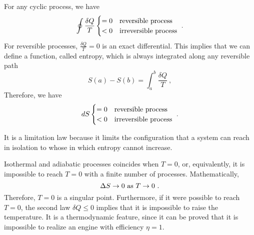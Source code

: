     \begin{law}[2nd]
        For any cyclic process, we have
        \begin{equation*}
            \oint \frac{\delta Q}{T} \begin{cases}
                = 0 & \textnormal{reversible process} \\
                < 0 & \textnormal{irreversible process} \\
            \end{cases} ~.
        \end{equation*}
        For reversible processes, $\frac{\delta Q}{T} = 0$ is an exact differential. This implies that we can define a function, called entropy, which is always integrated along any reversible path
        \begin{equation}\label{td:2nde}
            S(a) - S(b) = \int_a^b \frac{\delta Q}{T} ~,
        \end{equation}
        Therefore, we have  
        \begin{equation}\label{td:2nd}
            dS \begin{cases}
                = 0 & \textnormal{reversible process} \\
                < 0 & \textnormal{irreversible process} \\
            \end{cases} ~.
        \end{equation}
    \end{law}

    It is a limitation law because it limits the configuration that a system can reach in isolation to whose in which entropy cannot increase. 

    \begin{law}[3rd]
        Isothermal and adiabatic processes coincides when $T=0$, or, equivalently, it is impossible to reach $T=0$ with a finite number of processes. Mathematically,
        \begin{equation}\label{td:3rd}
            \Delta S \rightarrow 0 ~\textnormal{as}~ T \rightarrow 0 ~.
        \end{equation}
        Therefore, $T=0$ is a singular point. Furthermore, if it were possible to reach $T=0$, the second law $\delta Q \leq 0$ implies that it is impossible to raise the temperature. It is a thermodynamic feature, since it can be proved that it is impossible to realize an engine with efficiency $\eta = 1$.
    \end{law}

